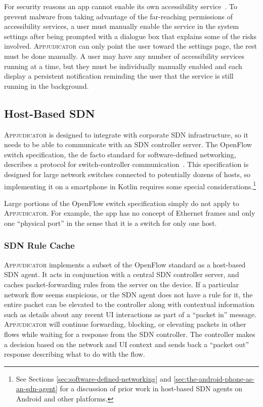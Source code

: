 For security reasons an app cannot enable its own accessibility
service~\cite{kalysch2018}. To prevent malware from taking advantage of the
far-reaching permissions of accessibility services, a user must manually enable
the service in the system settings after being prompted with a dialogue box that
explains some of the risks involved. \textsc{Appjudicator} can only point the
user toward the settings page, the rest must be done manually. A user may have
any number of accessibility services running at a time, but they must be
individually manually enabled and each display a persistent notification
reminding the user that the service is still running in the background.


\subsection{Host-Based SDN}
\label{sec:host-based-sdn}

\textsc{Appjudicator} is designed to integrate with corporate SDN
infrastructure, so it needs to be able to communicate with an SDN controller
server. The OpenFlow switch specification, the de facto standard for
software-defined networking, describes a protocol for switch-controller
communication~\cite{openflowspec}. This specification is designed for large
network switches connected to potentially dozens of hosts, so implementing it on
a smartphone in Kotlin requires some special considerations.\footnote{See
Sections \ref{sec:software-defined-networking} and
\ref{sec:the-android-phone-as-an-sdn-agent} for a discussion of prior work in
host-based SDN agents on Android and other platforms.}

Large portions of the OpenFlow switch specification simply do not apply to
\textsc{Appjudicator}. For example, the app has no concept of Ethernet frames
and only one ``physical port'' in the sense that it is a switch for only one
host.


\subsubsection{SDN Rule Cache}
\label{sec:implementation-sdn-rule-cache}

\textsc{Appjudicator} implements a subset of the OpenFlow standard as a
host-based SDN agent. It acts in conjunction with a central SDN controller
server, and caches packet-forwarding rules from the server on the device. If a
particular network flow seems suspicious, or the SDN agent does not have a rule
for it, the entire packet can be elevated to the controller along with
contextual information such as details about any recent UI interactions as part
of a ``packet in'' message. \textsc{Appjudicator} will continue forwarding,
blocking, or elevating packets in other flows while waiting for a response from
the SDN controller. The controller makes a decision based on the network and UI
context and sends back a ``packet out'' response describing what to do with the
flow.

